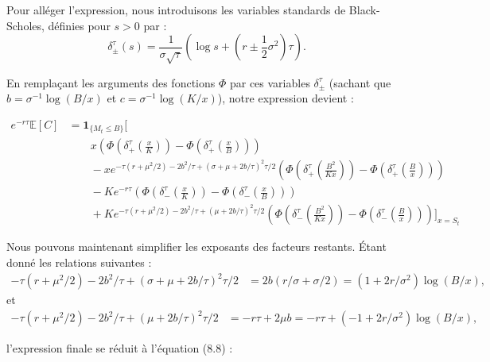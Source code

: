 \documentclass[11pt]{article}
\begin{document}
Pour alléger l'expression, nous introduisons les variables standards de Black-Scholes, définies pour $s > 0$ par :
\begin{equation}
\delta_{\pm}^{\tau}(s) = \frac{1}{\sigma\sqrt{\tau}} \left( \log s + \left(r \pm \frac{1}{2}\sigma^2\right)\tau \right).
\end{equation}

En remplaçant les arguments des fonctions $\Phi$ par ces variables $\delta_{\pm}^{\tau}$ (sachant que $b = \sigma^{-1}\log(B/x)$ et $c = \sigma^{-1}\log(K/x)$), notre expression devient :

\begin{align*}
e^{-r\tau} \mathbb{E}[C] &= \mathbf{1}_{\{M_t \le B\}} \Bigg[ \\
&\qquad x \left( \Phi\left(\delta_{+}^{\tau}\left(\frac{x}{K}\right)\right) - \Phi\left(\delta_{+}^{\tau}\left(\frac{x}{B}\right)\right) \right) \\
&\qquad - x e^{-\tau(r+\mu^2/2) - 2b^2/\tau + (\sigma+\mu+2b/\tau)^2\tau/2} \left( \Phi\left(\delta_{+}^{\tau}\left(\frac{B^2}{Kx}\right)\right) - \Phi\left(\delta_{+}^{\tau}\left(\frac{B}{x}\right)\right) \right) \\
&\qquad - K e^{-r\tau} \left( \Phi\left(\delta_{-}^{\tau}\left(\frac{x}{K}\right)\right) - \Phi\left(\delta_{-}^{\tau}\left(\frac{x}{B}\right)\right) \right) \\
&\qquad + K e^{-\tau(r+\mu^2/2) - 2b^2/\tau + (\mu+2b/\tau)^2\tau/2} \left( \Phi\left(\delta_{-}^{\tau}\left(\frac{B^2}{Kx}\right)\right) - \Phi\left(\delta_{-}^{\tau}\left(\frac{B}{x}\right)\right) \right) \Bigg]_{x=S_t}
\end{align*}

Nous pouvons maintenant simplifier les exposants des facteurs restants. Étant donné les relations suivantes :
\begin{align*}
-\tau(r+\mu^2/2) - 2b^2/\tau + (\sigma+\mu+2b/\tau)^2\tau/2 &= 2b(r/\sigma + \sigma/2) = (1 + 2r/\sigma^2)\log(B/x),
\end{align*}
et
\begin{align*}
-\tau(r+\mu^2/2) - 2b^2/\tau + (\mu+2b/\tau)^2\tau/2 &= -r\tau + 2\mu b = -r\tau + (-1 + 2r/\sigma^2)\log(B/x),
\end{align*}

l'expression finale se réduit à l'équation (8.8) :
\end{document}
